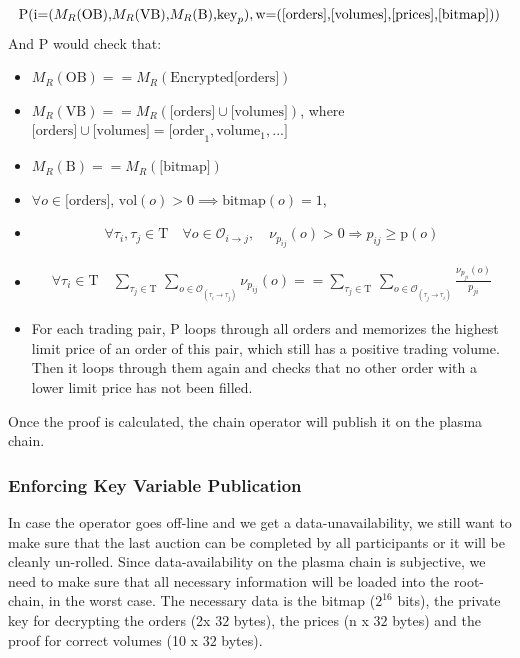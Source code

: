 \documentclass[11pt,parskip=full]{scrartcl}%
\newcommand{\Tau}{\mathrm{T}}
\def\pO{\mathcal{O}}
\def\ra{\rightarrow}
\begin{document}
\begin{equation}
\text{P(i=(}M_R\text{(OB),}M_R\text{(VB),}M_R\text{(B),} \text{key}_p),\\
\text{w=([orders],[volumes],[prices],[bitmap]))} 
\end{equation}
And P would check that:
\begin{itemize}
\item  $M_R(\text{OB}) == M_R(\text{Encrypted[orders]})$
\item  $M_R(\text{VB}) == M_R(\text{[orders]} \cup \text{[volumes]})$,\newline
where $\text{[orders]} \cup \text{[volumes]} = \text{[order}_1, \text{volume}_1, ...] $
\item $ M_R(\text{B}) == M_R(\text{[bitmap]})$
\item $\forall o \in \text{[orders], vol}(o)>0 \implies \text{bitmap}(o) = 1 $, 

\item 
\begin{equation}  \forall \tau_i ,\tau_j \in \Tau \quad \forall o \in \pO_{i\ra j}, \quad \nu_{p_{ij}}(o)>0 \Rightarrow p_{ij}\geq \text{p}(o)
\end{equation}
\item 
\begin{equation}
\begin{split}
\forall \tau_i \in \Tau \quad \sum_{\tau_j\in \Tau} \,
\sum_{ o\in \pO_{(\tau_i \rightarrow \tau_j)}} \nu_{p_{ij}}(o) == \sum_{\tau_j\in \Tau} \, \sum_{o\in \pO_{(\tau_j\rightarrow \tau_i)}} \frac{\nu_{p_{ji}}(o)}{p_{ji}}
\end{split}
\end{equation}
\item For each trading pair, P loops through all orders and memorizes the highest limit price of an order of this pair, which still has a positive trading volume. 
Then it loops through them again and checks that no other order with a lower limit price has not been filled. 
\end{itemize}

Once the proof is calculated, the chain operator will publish it on the plasma chain. 


\subsubsection{Enforcing Key Variable Publication}

\label{enforceAvailablity}
In case the operator goes off-line and we get a data-unavailability, we still want to make sure that the last auction can be completed by all participants or it will be cleanly un-rolled. 
Since data-availability on the plasma chain is subjective, we need to make sure that all necessary information will be loaded into the root-chain, in the worst case. 
The necessary data is the bitmap ($2^{16}$ bits), the private key for decrypting the orders (2x $32$ bytes), the prices (n x $32$ bytes) and the proof for correct volumes (10 x $32$ bytes).
\end{document}
